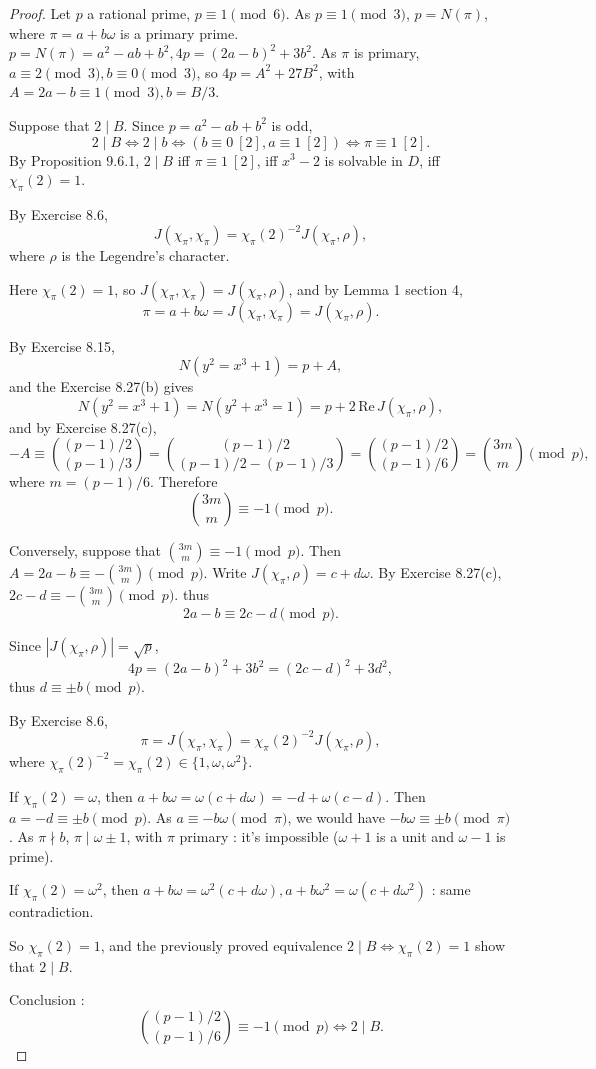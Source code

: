 \documentclass[11pt,a4paper]{article}
\newcommand{\re}{\,\mathrm{Re}\,}
\begin{document}
\begin{proof}
Let $p$ a rational prime, $p\equiv 1 \pmod 6$. As $p\equiv 1 \pmod 3$, $p = N(\pi)$, where $\pi = a + b\omega$ is a primary prime. $p = N(\pi) =a^2 -ab+b^2, 4p = (2a-b)^2 + 3b^2$. As $\pi$ is primary, $a\equiv 2 \pmod 3, b \equiv 0 \pmod 3$, so $4p = A^2 + 27 B^2$, with $A = 2a-b \equiv 1 \pmod 3, b = B/3$.

\bigskip

Suppose that $2\mid B$.
Since $p =a^2 -ab +b^2$ is odd,
$$2 \mid B \iff 2 \mid b \iff (b \equiv 0 \  [2], a\equiv 1\ [2]) \iff \pi \equiv 1 \ [2].$$
By Proposition 9.6.1,  $2 \mid B$ iff $\pi \equiv 1 \ [2]$, iff $x^3-2$ is solvable in $D$, iff $\chi_\pi(2) = 1$.

By Exercise 8.6,
$$J(\chi_\pi,\chi_\pi) = \chi_\pi(2)^{-2} J(\chi_\pi,\rho),$$
where $\rho $ is the Legendre's character.

Here $\chi_\pi(2) = 1$, so $J(\chi_\pi,\chi_\pi) =  J(\chi_\pi,\rho)$, and by Lemma 1 section 4, $$\pi = a + b \omega = J(\chi_\pi,\chi_\pi) = J(\chi_\pi,\rho).$$

By Exercise 8.15, $$N(y^2 = x^3+1) = p+A,$$ and the Exercise 8.27(b) gives
$$N(y^2 = x^3 + 1) = N(y^2 +x^3 = 1) = p+ 2 \re J(\chi_\pi,\rho),$$
and by Exercise 8.27(c),
$$-A \equiv \binom{(p-1)/2}{(p-1)/3} =\binom{(p-1)/2}{(p-1)/2 - (p-1)/3}  =  \binom{(p-1)/2}{(p-1)/6}=\binom{3m}{m} \pmod p,$$
where $m=(p-1)/6.$
Therefore
$$\binom{3m}{m} \equiv -1 \pmod p.$$

\bigskip

Conversely, suppose that $\binom{3m}{m} \equiv -1 \pmod p$. Then $A = 2a -b \equiv  -\binom{3m}{m} \pmod p$.
Write $J(\chi_\pi,\rho) = c + d\omega$. By Exercise 8.27(c), $2c - d \equiv -\binom{3m}{m} \pmod p$. thus
$$2a -b \equiv 2c - d \pmod p.$$

Since $|J(\chi_\pi,\rho)| = \sqrt{p}$, 
$$4p = (2a-b)^2 + 3b^2 = (2c-d)^2 + 3d^2,$$
thus $d \equiv \pm b \pmod p$.

By Exercise 8.6,
$$\pi = J(\chi_\pi,\chi_\pi) = \chi_\pi(2)^{-2} J (\chi_\pi,\rho),$$
where $\chi_\pi(2)^{-2} = \chi_\pi(2) \in \{1,\omega,\omega^2\}$.

If $\chi_\pi(2) = \omega$, then $a+b\omega = \omega(c+d\omega) = -d + \omega(c-d)$. Then $a = -d \equiv \pm b \pmod p$. As $a \equiv -b\omega \pmod \pi$, we would have $-b\omega \equiv \pm b \pmod \pi$. As $\pi \nmid b$, $\pi \mid \omega \pm 1$, with $\pi$ primary : it's impossible ($\omega + 1$ is a unit and $\omega - 1$ is prime).

If $\chi_\pi(2) = \omega^2$, then $a+b\omega = \omega^2(c+d\omega), a + b\omega^2 = \omega(c+d\omega^2)$ : same contradiction.

So $\chi_\pi(2) = 1$, and the previously proved equivalence $2\mid B \iff \chi_\pi(2) = 1$ show that $2 \mid B$.

Conclusion : $$\binom{(p-1)/2}{(p-1)/6} \equiv -1 \pmod p \iff 2 \mid B.$$
\end{proof}
\end{document}
